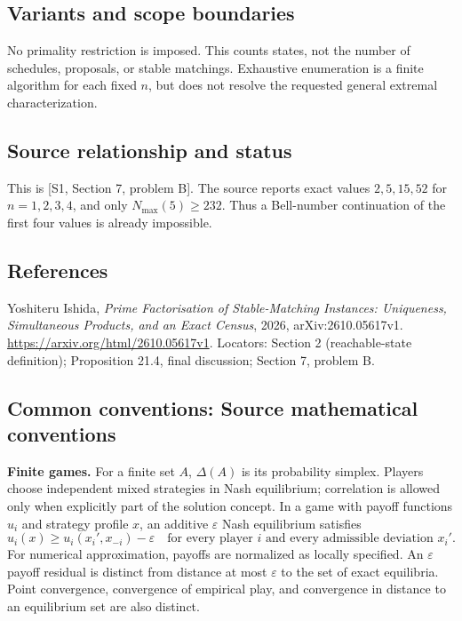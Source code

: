 \documentclass[11pt,a4paper]{article}
\begin{document}
\subsection*{Variants and scope boundaries}
No primality restriction is imposed. This counts states, not the number
of schedules, proposals, or stable matchings. Exhaustive enumeration is
a finite algorithm for each fixed \(n\), but does not resolve the requested
general extremal characterization.

\subsection*{Source relationship and status}
This is [S1, Section 7, problem B].
The source reports exact values \(2,5,15,52\) for \(n=1,2,3,4\),
and only \(N_{\max}(5)\geq 232\). Thus a Bell-number continuation of
the first four values is already impossible.

\subsection*{References}
\begingroup\footnotesize\raggedright
\noindent[S1] Yoshiteru Ishida,
\emph{Prime Factorisation of Stable-Matching Instances: Uniqueness,
Simultaneous Products, and an Exact Census}, 2026,
arXiv:2610.05617v1.
\url{https://arxiv.org/html/2610.05617v1}.
Locators: Section 2 (reachable-state definition);
Proposition 21.4, final discussion; Section 7, problem B.
\par\endgroup

\subsection*{Common conventions: Source mathematical conventions}

\textbf{Finite games.} For a finite set $A$, $\Delta(A)$ is its probability
simplex. Players choose independent mixed strategies in Nash equilibrium;
correlation is allowed only when explicitly part of the solution concept.
In a game with payoff functions $u_i$ and strategy profile $x$, an additive
$\varepsilon$ Nash equilibrium satisfies
\[
 u_i(x)\geq u_i(x_i',x_{-i})-\varepsilon
 \quad\text{for every player $i$ and every admissible deviation $x_i'$}.
\]
For numerical approximation, payoffs are normalized as locally specified.
An $\varepsilon$ payoff residual is distinct from distance at most
$\varepsilon$ to the set of exact equilibria. Point convergence, convergence
of empirical play, and convergence in distance to an equilibrium set are
also distinct.
\end{document}
